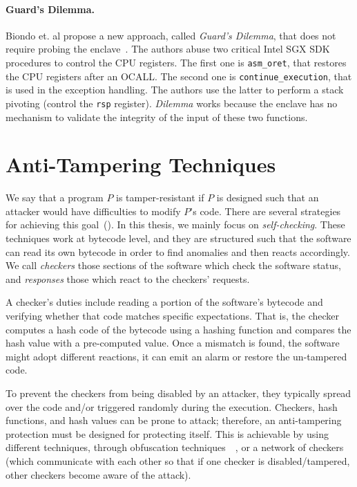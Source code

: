 \paragraph{Guard's Dilemma.}
Biondo et. al propose a new approach, called \emph{Guard's Dilemma}, that does 
not require probing the enclave~\cite{biondo2018guard}.
The authors abuse two critical Intel SGX SDK procedures to control the CPU 
registers.
The first one is \texttt{asm\_oret}, that restores the CPU registers after an  
OCALL.
The second one is \texttt{continue\_execution}, that is used in the exception
handling.
The authors use the latter to perform a stack pivoting (\ie control the 
\texttt{rsp} register).
\emph{Dilemma} works because the enclave has no mechanism to validate
the integrity of the input of these two functions.

\section{Anti-Tampering Techniques}
\label{anti-tampering-techniques}

We say that a program $P$ is tamper-resistant if $P$ is designed such that an 
attacker would have difficulties to modify $P$'s code.
There are several strategies for achieving this 
goal~(\cite{nagra2009surreptitious}).
In this thesis, we mainly focus on \emph{self-checking}.
These techniques work at bytecode level, and they are structured such that the 
software can read its own bytecode in order to find anomalies and then reacts 
accordingly.
We call \emph{checkers} those sections of the software which check the software 
status, and \emph{responses} those which react to the checkers' requests.

A checker's duties include reading a portion of the software's bytecode and 
verifying whether that code matches specific expectations. That is, the checker 
computes a hash code of the bytecode using a hashing function and compares the 
hash value with a pre-computed value. 
Once a mismatch is found, the software might adopt different reactions, \eg it 
can emit an alarm or restore the un-tampered code. 

To prevent the checkers from being disabled by an attacker, they typically 
spread over the code and/or triggered randomly during the execution.
Checkers, hash functions, and hash values can be prone to attack; therefore, an 
anti-tampering protection must be designed for protecting itself.
This is achievable by using different techniques,
\eg through obfuscation techniques~~\cite{banescu2017tutorial}, or a network of 
checkers (which communicate with each other so that if one checker is 
disabled/tampered, other checkers become aware of the attack).